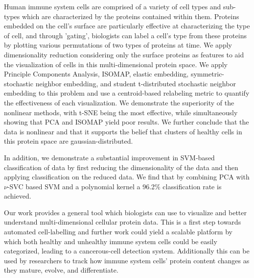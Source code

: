 \documentclass{article}
\begin{document}
Human immune system cells are comprised of a variety of cell types and sub-types which are characterized by the proteins contained within them. Proteins embedded on the cell's surface are particularly effective at characterizing the type of cell, and through 'gating', biologists can label a cell's type from these proteins by plotting various permutations of two types of proteins at time. We apply dimensionality reduction considering only the surface proteins as features to aid the visualization of cells in this multi-dimensional protein space. We apply Principle Components Analysis, ISOMAP, elastic embedding, symmetric-stochastic neighbor embedding, and student t-distributed stochastic neighbor embedding to this problem and use a centroid-based relabeling metric to quantify the effectiveness of each visualization. We demonstrate the superiority of the nonlinear methods, with t-SNE being the most effective, while simultaneously showing that PCA and ISOMAP yield poor results. We further conclude that the data is nonlinear and that it supports the belief that clusters of healthy cells in this protein space are gaussian-distributed. 

In addition, we demonstrate a substantial improvement in SVM-based classification of data by first reducing the dimensionality of the data and then applying classification on the reduced data. We find that by combining PCA with $\nu$-SVC based SVM and a polynomial kernel a 96.2\% classification rate is achieved. 

Our work provides a general tool which biologists can use to visualize and better understand multi-dimensional cellular protein data. This is a first step towards automated cell-labelling and further work could yield a scalable platform by which both healthy and unhealthy immune system cells could be easily categorized, leading to a cancerous-cell detection system. Additionally this can be used by researchers to track how immune system cells' protein content changes as they mature, evolve, and differentiate. 
\end{document}
